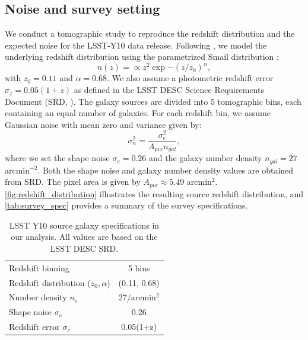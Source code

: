 \documentclass{aa}
\begin{document}
\subsection{Noise and survey setting}
We conduct a tomographic study to reproduce the redshift distribution and the expected noise for the LSST-Y10 data release.
Following \citet{zhang2022transitioning}, we model the underlying redshift distribution using the parametrized Smail distribution \citep{smail1995deep}:
\begin{equation}
    n(z)=\propto z^2 \exp{-(z/z_0)^{\alpha}},
\end{equation}
with $z_0=0.11$ and $\alpha=0.68$. We also assume a photometric redshift error $\sigma_z=0.05(1+z)$ as defined in the LSST DESC Science Requirements Document (SRD, \citet{mandelbaum2018lsst}).
The galaxy sources are divided into 5 tomographic bins, each containing an equal number of galaxies. 
For each redshift bin, we assume Gaussian noise with mean zero and variance given by:
 \begin{equation}
     \sigma^2_n= \frac{\sigma_e^2}{A_{pix}n_{gal}},
 \end{equation}
where we set the shape noise $\sigma_e = 0.26$ and the galaxy number density $n_{gal}=27$ arcmin$^{-2}$. Both the shape noise and galaxy number density values are obtained from SRD. The pixel area is given by $A_{pix}\approx 5.49$ arcmin$^2$. 
\autoref{fig:redshift_distribution} illustrates the resulting source redshift distribution, and \autoref{tab:survey_spec} provides a summary of the survey specifications.
\begin{table}
	\begin{center}
    	\begin{tabular}{lc} 
            \hline \hline
    		Redshift binning & 5 bins \\
    		Redshift distribution ($z_{0}, \alpha$) & (0.11, 0.68)  \\
    		Number density $n_s$ & 27/arcmin$^2$ \\
    		Shape noise $\sigma_e$ & 0.26 \\
    		Redshift error $\sigma_z$ &0.05(1+z)  \\
    		\hline
    	\end{tabular}
     	\caption{ LSST Y10 source galaxy specifications in our analysis. All values are based on the LSST DESC SRD.}
	    \label{tab:survey_spec}
    \end{center}
\end{table}
\end{document}
